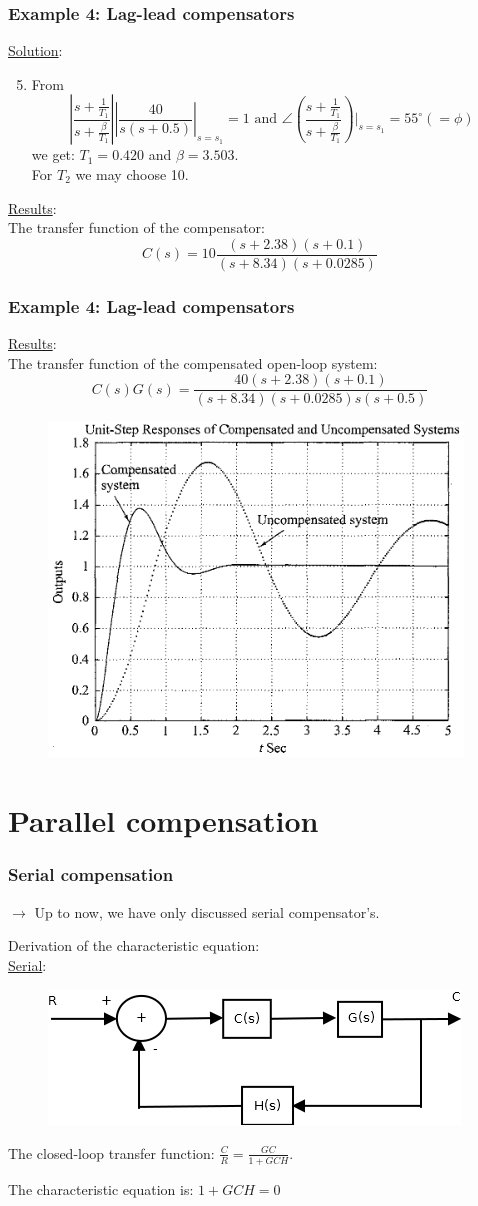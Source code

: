 \begin{frame}
	\frametitle{Example 4: Lag-lead compensators}
	\underline{Solution}:
	\begin{enumerate}
		\setcounter{enumi}{4}
		\item From
		$$|\frac{s+\frac{1}{T_1}}{s+\frac{\beta}{T_1}}||\frac{40}{s(s+0.5)}|_{s=s_1}=1 \text{ and } \angle(\frac{s+\frac{1}{T_1}}{s+\frac{\beta}{T_1}})|_{s=s_1}=55^{\circ}(=\phi)$$
		we get: $T_1=0.420$ and $\beta=3.503$.\\
		For $T_2$ we may choose 10.
	\end{enumerate}
	\underline{Results}:\\
	The transfer function of the compensator:
	$$C(s)=10\frac{(s+2.38)(s+0.1)}{(s+8.34)(s+0.0285)}$$
\end{frame}

\begin{frame}
	\frametitle{Example 4: Lag-lead compensators}
	\underline{Results}:\\
	The transfer function of the compensated open-loop system:
	$$C(s)G(s)=\frac{40(s+2.38)(s+0.1)}{(s+8.34)(s+0.0285)s(s+0.5)}$$
	\begin{figure}
		\centering
		\includegraphics[width=0.48\linewidth]{Ex4_response}
	\end{figure}
\end{frame}

\section{Parallel compensation}

\begin{frame}
	\frametitle{Serial compensation}
	$\rightarrow$ Up to now, we have only discussed serial compensator's. \vspace{4mm}
	
	Derivation of the characteristic equation:\\
	\underline{Serial}:
	\begin{figure}
		\centering
		\includegraphics[width=0.7\linewidth]{Serial_compensator}
	\end{figure}
	The closed-loop transfer function: $\frac{C}{R}=\frac{GC}{1+GCH}$.\vspace{3mm}
	
	The characteristic equation is: $1+GCH=0$
\end{frame}

